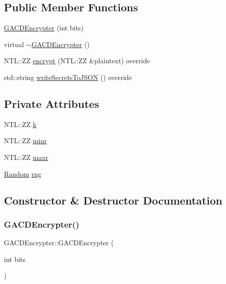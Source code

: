 \subsection*{Public Member Functions}
\begin{DoxyCompactItemize}
\item 
\hyperlink{classGACDEncrypter_a923b16f668dca6e17857df7c825ab66f}{G\+A\+C\+D\+Encrypter} (int bits)
\item 
virtual \hyperlink{classGACDEncrypter_a9cccf9b5e5f8728c1df5c73cea492fca}{$\sim$\+G\+A\+C\+D\+Encrypter} ()
\item 
N\+T\+L\+::\+ZZ \hyperlink{classGACDEncrypter_a310a857f6b77a6c83d4319968d49902f}{encrypt} (N\+T\+L\+::\+ZZ \&plaintext) override
\item 
std\+::string \hyperlink{classGACDEncrypter_a01cd18ae81d0d28076c4ceb690a8b418}{write\+Secrets\+To\+J\+S\+ON} () override
\end{DoxyCompactItemize}
\subsection*{Private Attributes}
\begin{DoxyCompactItemize}
\item 
N\+T\+L\+::\+ZZ \hyperlink{classGACDEncrypter_af235b4e988a563f05d29b461c88f8703}{k}
\item 
N\+T\+L\+::\+ZZ \hyperlink{classGACDEncrypter_a6b0e9a07d27ec0976cc7958df6f666a4}{minr}
\item 
N\+T\+L\+::\+ZZ \hyperlink{classGACDEncrypter_a646b9daae82d6666d6a8affd3de41fd5}{maxr}
\item 
\hyperlink{classRandom}{Random} \hyperlink{classGACDEncrypter_a3f8959f045b15262ae7d680b35d0815c}{rng}
\end{DoxyCompactItemize}


\subsection{Constructor \& Destructor Documentation}
\mbox{\label{classGACDEncrypter_a923b16f668dca6e17857df7c825ab66f}} 
\subsubsection{\texorpdfstring{G\+A\+C\+D\+Encrypter()}{GACDEncrypter()}}
{\footnotesize\ttfamily G\+A\+C\+D\+Encrypter\+::\+G\+A\+C\+D\+Encrypter (\begin{DoxyParamCaption}\item[{int}]{bits }\end{DoxyParamCaption})}

